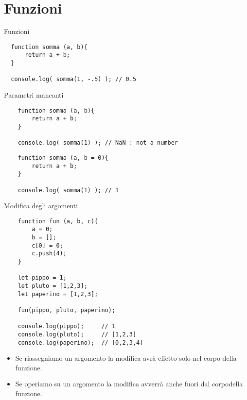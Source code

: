 \section{Funzioni}
\begin{frame}[fragile]{Funzioni}\transfade\centering
\begin{verbatim}
  function somma (a, b){
      return a + b;
  }

  console.log( somma(1, -.5) ); // 0.5
\end{verbatim}
\end{frame}

\begin{frame}[fragile]{Parametri mancanti}\transfade\centering
  \begin{verbatim}
    function somma (a, b){
        return a + b;
    }

    console.log( somma(1) ); // NaN : not a number
  \end{verbatim}
  \pause\bigskip
  \begin{verbatim}
    function somma (a, b = 0){
        return a + b;
    }

    console.log( somma(1) ); // 1
  \end{verbatim}
\end{frame}

\begin{frame}[fragile]{Modifica degli argomenti}\transfade\centering
  \begin{verbatim}
    function fun (a, b, c){
        a = 0;
        b = [];
        c[0] = 0;
        c.push(4);
    }

    let pippo = 1;
    let pluto = [1,2,3];
    let paperino = [1,2,3];

    fun(pippo, pluto, paperino);

    console.log(pippo);     // 1
    console.log(pluto);     // [1,2,3]
    console.log(paperino);  // [0,2,3,4]
  \end{verbatim}
  \bigskip
  \begin{itemize}
    \item Se riassegniamo un argomento la modifica avrà effetto solo nel corpo della funzione.
    \item Se operiamo su un argomento la modifica avverrà anche fuori dal corpodella funzione.
  \end{itemize}
\end{frame}

